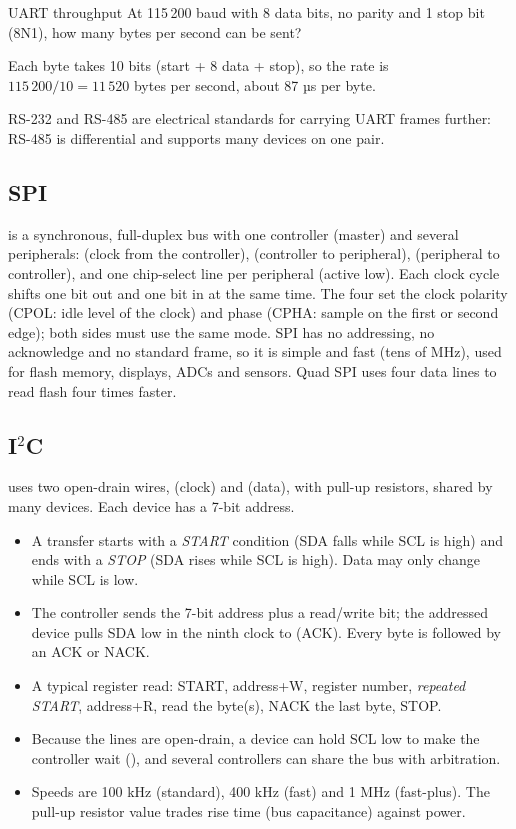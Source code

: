 \begin{worked}{UART throughput}
At 115\,200 baud with 8 data bits, no parity and 1 stop bit (8N1), how many bytes per second can be sent?

Each byte takes 10 bits (start + 8 data + stop), so the rate is $115\,200 / 10 = 11\,520$ bytes per second, about 87 µs per byte.
\end{worked}

RS-232 and RS-485 are electrical standards for carrying UART frames further: RS-485 is differential and supports many devices on one pair.

\subsection*{SPI}

 is a synchronous, full-duplex bus with one controller (master) and several peripherals:  (clock from the controller),  (controller to peripheral),  (peripheral to controller), and one chip-select line per peripheral (active low). Each clock cycle shifts one bit out and one bit in at the same time. The four  set the clock polarity (CPOL: idle level of the clock) and phase (CPHA: sample on the first or second edge); both sides must use the same mode. SPI has no addressing, no acknowledge and no standard frame, so it is simple and fast (tens of MHz), used for flash memory, displays, ADCs and sensors. Quad SPI uses four data lines to read flash four times faster.

\subsection*{I$^2$C}

 uses two open-drain wires,  (clock) and  (data), with pull-up resistors, shared by many devices. Each device has a 7-bit address.
\begin{itemize}
  \item A transfer starts with a \emph{START} condition (SDA falls while SCL is high) and ends with a \emph{STOP} (SDA rises while SCL is high). Data may only change while SCL is low.
  \item The controller sends the 7-bit address plus a read/write bit; the addressed device pulls SDA low in the ninth clock to  (ACK). Every byte is followed by an ACK or NACK.
  \item A typical register read: START, address+W, register number, \emph{repeated START}, address+R, read the byte(s), NACK the last byte, STOP.
  \item Because the lines are open-drain, a device can hold SCL low to make the controller wait (), and several controllers can share the bus with arbitration.
  \item Speeds are 100 kHz (standard), 400 kHz (fast) and 1 MHz (fast-plus). The pull-up resistor value trades rise time (bus capacitance) against power.
\end{itemize}

